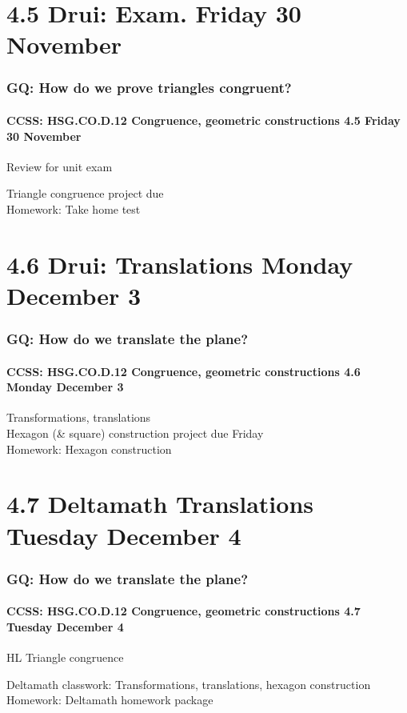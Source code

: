 \documentclass{beamer}
\begin{document}
\section{4.5 Drui: Exam. Friday 30 November}
  \frame
  {
    \frametitle{GQ: How do we prove triangles congruent?}
    \framesubtitle{CCSS: HSG.CO.D.12 Congruence, geometric constructions  \alert{4.5 Friday 30 November}}

    \begin{block}{Review for unit exam}
    \end{block}
    Triangle congruence project due\\[0.5cm]
    Homework: Take home test
  }

  \section{4.6 Drui: Translations Monday December 3}
    \frame
    {
      \frametitle{GQ: How do we translate the plane?}
      \framesubtitle{CCSS: HSG.CO.D.12 Congruence, geometric constructions  \alert{4.6 Monday December 3}}

      Transformations, translations\\
      Hexagon (\& square) construction project due Friday\\[0.5cm]
      Homework: Hexagon construction
    }

  \section{4.7 Deltamath Translations Tuesday December 4}
    \frame
    {
      \frametitle{GQ: How do we translate the plane?}
      \framesubtitle{CCSS: HSG.CO.D.12 Congruence, geometric constructions  \alert{4.7 Tuesday December 4}}

      \begin{block}{HL Triangle congruence}
      \end{block}
      Deltamath classwork: Transformations, translations, hexagon construction\\[0.5cm]
      Homework: Deltamath homework package
    }
\end{document}
